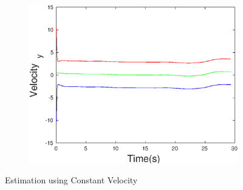 \begin{figure}[h]
\begin{subfigure}{.5\linewidth}
\end{subfigure}
\begin{subfigure}{.5\linewidth}
\centering
\includegraphics[width=.9\linewidth]{figures/Frad/s3cvSMVelocity_y}
\end{subfigure}
\caption{Estimation using Constant Velocity}
\end{figure}

